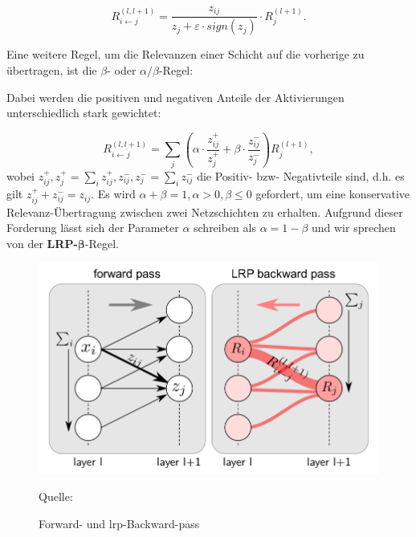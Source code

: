 \documentclass[twoside, 12pt,a4paper]{book}
\newcommand{\source}[1]{\caption*{\hfill Quelle: {#1}} }
\numberwithin{equation}{section}
\begin{document}
	\begin{equation}
	R_{i\leftarrow j}^{(l,l+1)} = 
	\frac{z_{ij}}{z_j + \varepsilon \cdot sign(z_j)} \cdot R_j^{(l+1)}.
	\end{equation}
	
	
	\noindent Eine weitere Regel, um die Relevanzen einer Schicht auf die vorherige zu übertragen, ist die $\beta$- oder $\alpha/\beta$-Regel:
	
	\noindent Dabei werden die positiven und negativen Anteile der Aktivierungen unterschiedlich stark gewichtet:
	
	\begin{equation}
		R_{i\leftarrow j}^{(l,l+1)} = \sum_j{\left( \alpha \cdot \frac{z_{ij}^+}{z_j^+} + \beta \cdot \frac{z_{ij}^-}{z_j^-}\right)R_j^{(l+1)}},
	\end{equation}
	wobei $z_{ij}^+, z_j^+ = \sum_i{z_{ij}^+}, z_{ij}^-, z_j^- = \sum_i{z_{ij}^-}$ die Positiv- bzw- Negativteile sind, d.h. es gilt $z_{ij}^+  + z_{ij}^- = z_{ij}$. Es wird $\alpha + \beta = 1, \alpha > 0, \beta \leq 0$ gefordert, um eine konservative Relevanz-Übertragung zwischen zwei Netzschichten zu erhalten. Aufgrund dieser Forderung lässt sich der Parameter $\alpha$ schreiben als $\alpha = 1- \beta$ und wir sprechen von der \textbf{LRP-}$\boldsymbol{\beta}$-Regel.  
	
	\begin{figure}[ht]
		\centering
		\includegraphics[width=0.3\textheight]{LRP_scheme.png}
		\caption[LRP-Schema]{Forward- und \ac{lrp}-Backward-pass}
		\source{\cite{lapuschkin}}
		\label{im:lrp_schema}
	\end{figure}
	
\end{document}
